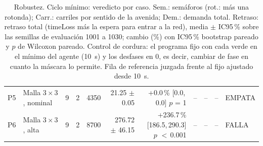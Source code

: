 \begin{table}[H]
\begin{tabular}{llcrrrrrrcl}
P5 & \makecell[l]{Malla $3 \times 3$,\\{}nominal} & 9 & 2 & 4350 & \makecell[r]{21.25\\{}$\pm$ 0.05} & \makecell[r]{+0.0\,\%\\{}[0.0,\,0.0]\\$p$ = 1} & -- & -- & -- & EMPATA \\
P6 & \makecell[l]{Malla $3 \times 3$,\\{}alta} & 9 & 2 & 8700 & \makecell[r]{276.72\\{}$\pm$ 46.15} & \makecell[r]{+236.7\,\%\\{}[186.5,\,290.3]\\$p$ $<$\,0.001} & -- & -- & -- & FALLA \\
\bottomrule
\end{tabular}
\caption[Robustez: veredicto del ciclo mínimo]{Robustez. Ciclo mínimo: veredicto por caso. Sem.: semáforos (rot.: más una rotonda); Carr.: carriles por sentido de la avenida; Dem.: demanda total. Retraso: retraso total (timeLoss más la espera para entrar a la red), media $\pm$ IC95\,\% sobre las semillas de evaluación 1001 a 1030; cambio (\%) con IC95\,\% bootstrap pareado y $p$ de Wilcoxon pareado. Control de cordura: el programa fijo con cada verde en el mínimo del agente (10~s) y los desfases en 0, es decir, cambiar de fase en cuanto la máscara lo permite. Fila de referencia juzgada frente al fijo ajustado desde 10~s.}
\label{tab:robustez-veredicto-trivial}
\end{table}

